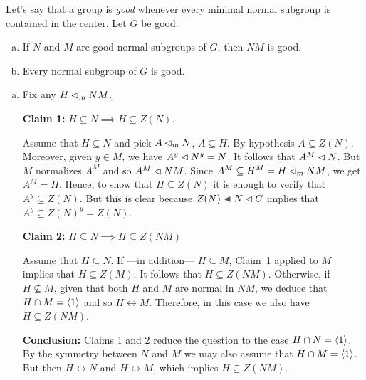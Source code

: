 \begin{exr}
    Let's say that a group is \textsl{good} whenever every minimal normal subgroup is contained in the center. Let\/ $G$ be good.
    \begin{enumerate}[a),font=\upshape]
    \item If\/ $N$ and\/ $M$ are good normal subgroups of\/ $G$, then\/ $NM$ is good.
    \item Every normal subgroup of\/ $G$ is good.
    \end{enumerate}
\end{exr}

\begin{solution}
\begin{enumerate}[a),font=\upshape]
    \item Fix any $H\lhd_mNM$.
    
    \textbf{Claim 1: } $H\subseteq N\implies H\subseteq Z(N)$.
    
    {\small Assume that $H\subseteq N$ and pick $A\lhd_mN$, $A\subseteq H$. By hypothesis $A\subseteq Z(N)$. Moreover, given $y\in M$, we have $A^y\lhd N^y=N$. It follows that $A^M\lhd N$. But $M$ normalizes $A^M$ and so $A^M\lhd NM$. Since $A^M\subseteq H^M=H\lhd_m NM$, we get $A^M=H$. Hence, to show that $H\subseteq Z(N)$ it is enough to verify that $A^y\subseteq Z(N)$. But this is clear because $Z(N)\ch N\normal G$ implies that $A^y\subseteq Z(N)^y=Z(N)$.}

    \medskip

    \textbf{Claim 2:} $H\subseteq N\implies H\subseteq Z(NM)$

    {\small Assume that $H\subseteq N$. If ---in addition--- $H\subseteq M$, Claim~1 applied to $M$ implies that $H\subseteq Z(M)$. It follows that $H\subseteq Z(NM)$. Otherwise, if $H\not\subseteq M$, given that both $H$ and $M$ are normal in $NM$, we deduce that $H\cap M=\langle1\rangle$ and so $H\leftrightarrow M$. Therefore, in this case we also have $H\subseteq Z(NM)$.}

    \medskip

    \textbf{Conclusion:} Claims 1 and 2 reduce the question to the case $H\cap N=\langle1\rangle$. By the symmetry between $N$ and $M$ we may also assume that $H\cap M=\langle1\rangle$. But then $H\leftrightarrow N$ and $H\leftrightarrow M$, which implies $H\subseteq Z(NM)$.


\end{enumerate}
\end{solution}
